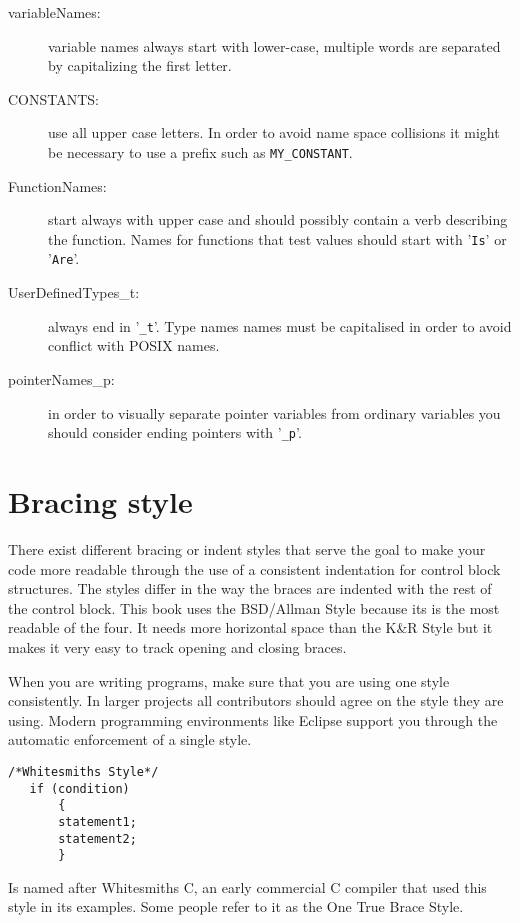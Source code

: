\begin{description}
\item[variableNames: ] variable names always start with lower-case, multiple 
words are separated by capitalizing the first letter. 
\item[CONSTANTS: ] use all upper case letters. In order to avoid name space
collisions it might be necessary to use a prefix such as {\tt MY\_CONSTANT}.
\item[FunctionNames:] start always with upper case and should possibly 
contain a verb describing the function. Names for functions that test values should 
start with '{\tt Is}' or '{\tt Are}'.  
\item[UserDefinedTypes\_t:] always end in '{\tt \_t}'. Type names names must be 
capitalised in order to avoid conflict with POSIX names.
\item[pointerNames\_p:] in order to visually separate pointer variables from
ordinary variables you should consider ending pointers with '{\tt \_p}'.
\end{description}

\section{Bracing style}

There exist different bracing or indent styles that serve the goal
to make your code more readable through the use of a consistent 
indentation for control block structures.
The styles differ in the way the braces are indented with the rest
of the control block.
This book uses the BSD/Allman Style because its is the most 
readable of the four. It needs more horizontal space than the K\&R Style
but it makes it very easy to track opening and closing braces.

When you are writing programs, make sure that you are using one
style consistently. In larger projects all contributors should agree
on the style they are using. Modern programming environments like
Eclipse support you through the automatic enforcement of a single style.

\begin{verbatim}
/*Whitesmiths Style*/
   if (condition)            
       {
       statement1; 
       statement2;
       }
\end{verbatim}

Is named after Whitesmiths C, an early commercial C compiler that 
used this style in its examples. Some people refer to it as the 
One True Brace Style.

